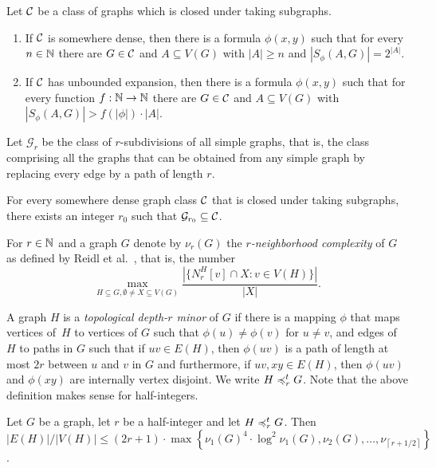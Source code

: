 \begin{theorem}
Let $\mathcal{C}$ be a class of graphs which 
is closed under taking subgraphs. 
\begin{enumerate}
\item If $\mathcal{C}$ is somewhere dense, then there is a formula 
$\phi(x,y)$ such that for every $n\in \mathbb{N}$ there are $G\in\mathcal{C}$ and $A\subseteq V(G)$ 
with $|A|\geq n$ and $|S_\phi(A,G)|=2^{|A|}$. 
\item If $\mathcal{C}$ has unbounded expansion, then there is a formula 
$\phi(x,y)$ such that for every function $f:\mathbb{N}\rightarrow \mathbb{N}$ 
there are $G\in\mathcal{C}$ and $A\subseteq V(G)$ 
with $|S_\phi(A,G)|>f(|\phi|)\cdot |A|$. 
\end{enumerate}
\end{theorem}

Let $\mathcal{G}_r$ be the class of $r$-subdivisions of all 
simple graphs, that is, the class comprising
all the graphs that can be obtained from any simple graph by replacing every edge by a path of
length $r$.

\begin{lemma}\label{lem:lower-nd}
For every somewhere dense graph class $\mathcal{C}$ that is closed 
under taking subgraphs, there
exists an integer $r_0$ such that $\mathcal{G}_{r_0}\subseteq \mathcal{C}$.
\end{lemma}

For $r\in \mathbb{N}$ and a graph $G$ denote by $\nu_r(G)$ the
\emph{$r$-neighborhood complexity} of $G$ as defined
by Reidl et al.~\cite{reidl2016characterising}, that is, the number 
\[\max_{H\subseteq G,\emptyset\neq X\subseteq V(G)}\frac{|\{N_r^H[v]\cap X : v\in V(H)\}|}{|X|}.\] 

A graph $H$ is a \emph{topological depth-$r$ minor} of $G$ if
there is a mapping $\phi$ that maps vertices of~$H$ to 
vertices of $G$ such that $\phi(u)\neq \phi(v)$ for 
$u\neq v$, and edges of $H$ to paths in 
$G$ such that if $uv\in E(H)$, then $\phi(uv)$
is a path of length at most $2r$ between $u$ and $v$ in 
$G$ and furthermore, if $uv, xy\in E(H)$, then 
$\phi(uv)$ and $\phi(xy)$ are internally vertex
disjoint. We write $H\preccurlyeq_r^t G$. 
Note that the above definition makes sense for 
half-integers. 

\begin{lemma}\label{lem:lower-be}
Let $G$ be a graph, let $r$ be a half-integer 
and let $H\preccurlyeq_r^tG$. 
Then $|E(H)|/|V(H)|\leq (2r + 1)\cdot \max \left\{\nu_1(G)^4\cdot \log^2\nu_1(G),\nu_2(G),\ldots, \nu_{\left\lceil r+1/2\right\rceil}\right\}$.
\end{lemma}

